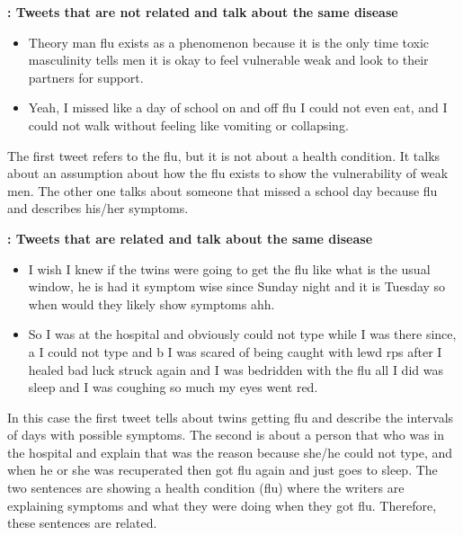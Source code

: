 \documentclass[12pt]{report}
\begin{document}
\begin{definition} {\bf : Tweets that are not related  and talk about the same disease}
	\begin{itemize}[nolistsep]
		\item Theory man flu exists as a phenomenon because it is the only time toxic masculinity tells men it is okay to feel vulnerable weak and look to their partners for support.
		\item Yeah, I missed like a day of school on and off flu I could not even eat, and I could not walk without feeling like vomiting or collapsing.
	\end{itemize}
\end{definition}
The first tweet refers to the flu, but it is not about a health condition. It talks about  an assumption about how the flu exists to show the vulnerability of weak  men. The  other one talks about someone that missed a school day because flu and describes  his/her symptoms.


\begin{definition} {\bf : Tweets that are  related  and talk about the same disease}
	\begin{itemize}[nolistsep]
		\item I wish I knew if the twins were going to get the flu like what is the usual window, he is had it symptom wise since Sunday night and it is Tuesday so when would they likely show symptoms ahh.
		\item So I was at the hospital and obviously could not type while I was there since, a I could not type and b I was scared of being caught with lewd rps after I healed bad luck struck again and I was bedridden with the flu all I did was sleep and I was coughing so much my eyes went red.
	\end{itemize}
\end{definition}
In this case the first tweet tells about twins getting flu and describe the intervals of days with possible symptoms. The second is about a person that who was in the hospital and explain that was the reason because she/he could not type, and when he or she was recuperated then got flu again and just goes to sleep. The two sentences are showing a health condition (flu) where the writers are explaining symptoms and what they were doing when they got flu. Therefore, these sentences are related.
\end{document}
